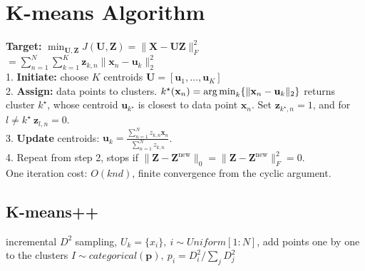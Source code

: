 \section{K-means Algorithm}
\textbf{Target:} $\min_{\mathbf{U}, \mathbf{Z}} J(\mathbf{U}, \mathbf{Z}) = \|\mathbf{X} - \mathbf{U} \mathbf{Z}\|_F^2$\\
$= \sum_{n=1}^N \sum_{k=1}^K \mathbf{z}_{k,n} \|\mathbf{x}_n - \mathbf{u}_k\|_2^2$\\
1. \textbf{Initiate:} choose $K$ centroids $\mathbf{U} = [\mathbf{u}_1, \ldots, \mathbf{u}_K]$\\
2. \textbf{Assign:} data points to clusters. $k^\star(\mathbf{x}_n) = \operatorname*{arg\,min}_k \{ \|\mathbf{x}_n - \mathbf{u}_k\|_2 \}$ returns cluster $k^\star$, whose centroid $\mathbf{u}_{k^\star}$ is closest to data point $\mathbf{x}_n$. Set $\mathbf{z}_{k^\star,n} = 1$, and for $ l \neq k^\star~ \mathbf{z}_{l,n}=0$.\\
3. \textbf{Update} centroids: $\mathbf{u}_k = \frac{\sum_{n=1}^N z_{k,n} \mathbf{x}_n}{\sum_{n=1}^N z_{k,n}}$.\\
4. Repeat from step 2, stops if $\|\mathbf{Z} - \mathbf{Z}^\text{new}\|_0 = \|\mathbf{Z} - \mathbf{Z}^\text{new}\|^2_F = 0$.\\
One iteration cost: $O(k n d)$, finite convergence from the cyclic argument.
\subsection*{K-means++}
incremental $D^2$ sampling, $U_k = \{x_i\}, ~ i \sim Uniform[1:N]$, add points one by one to the clusters $I \sim categorical(\mathbf{p}),~ p_i = D_i^2 / \sum_j D_j^2$
